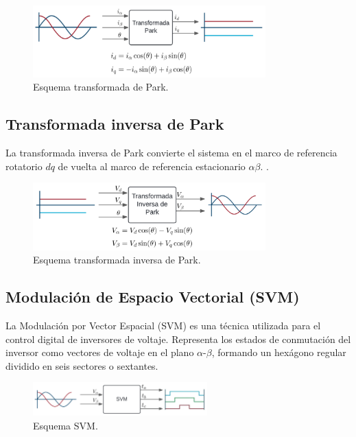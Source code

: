 \documentclass[11pt]{report}
\begin{document}
\begin{figure}[ht]
	\centering
	\includegraphics[width=0.8\textwidth]{imagenes/park.png}
	\caption{Esquema transformada de Park.}
\end{figure}
\FloatBarrier

\subsection{Transformada inversa de Park}
La transformada inversa de Park convierte el sistema en el marco de referencia rotatorio \(dq\) de vuelta al marco de referencia estacionario \(\alpha\beta\). \cite{AN1078}.

\begin{figure}[ht]
	\centering
	\includegraphics[width=0.8\textwidth]{imagenes/park_inv.png}
	\caption{Esquema transformada inversa de Park.}
\end{figure}
\FloatBarrier

\newpage
\subsection{Modulación de Espacio Vectorial (SVM)}
La Modulación por Vector Espacial (SVM) es una técnica utilizada para el control digital de inversores de voltaje. Representa los estados de conmutación del inversor como vectores de voltaje en el plano $\alpha$-$\beta$, formando un hexágono regular dividido en seis sectores o sextantes.

\begin{figure}[ht]
	\centering
	\includegraphics[width=0.6\textwidth]{imagenes/SVM.png}
	\caption{Esquema SVM.}
\end{figure}
\FloatBarrier
\end{document}

